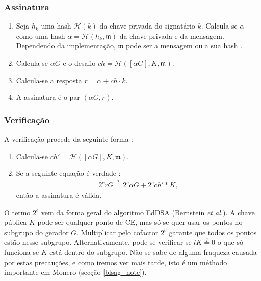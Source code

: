 \begin{enumerate}
\subsubsection*{Assinatura}

\begin{enumerate}
	\item Seja \(h_k\) uma hash \(\mathcal{H}(k)\) da chave privada do signatário \(k\). Calcula-se \(\alpha\) como uma hash \(\alpha = \mathcal{H}(h_k, \mathfrak{m})\) da chave privada e da mensagem. Dependendo da implementação, $\mathfrak{m}$ pode ser a mensagem ou a sua hash \cite{rfc8032}.  

	
	\item Calcula-se \(\alpha G\) e o desafio $ch = \mathcal{H}([\alpha G], K,  \mathfrak{m})$.

	\item Calcula-se a resposta \(r = \alpha + ch \cdot k \).
	
	\item A assinatura é o par \((\alpha G, r)\).
\end{enumerate}

\subsubsection*{Verificação}
A verificação procede da seguinte forma :

\begin{enumerate}
	\item Calcula-se \(ch' = \mathcal{H}([\alpha G], K,  \mathfrak{m})\).
	
	\item Se a seguinte equação é verdade :
\begin{align*}
2^c r G \stackrel{?}{=} 2^c \alpha G + 2^c ch'*K ,
\end{align*}
então a assinatura é válida.
\end{enumerate}

O termo $2^c$ vem da forma geral do algoritmo EdDSA (Bernstein {\em et al.}\cite{Bernstein2012}).  
A chave pública $K$ pode ser qualquer ponto de CE, mas só se quer usar os pontos no subgrupo do gerador $G$. Multiplicar pelo cofactor $2^c$ garante que todos os pontos estão nesse subgrupo. Alternativamente, pode-se verificar se $l K \stackrel{?}{=} 0$ o que só funciona se $K$ está dentro do subgrupo. Não se sabe de alguma fraqueza causada por estas precauções, e como iremos ver mais tarde, isto é um méthodo importante em Monero (secção \ref{blsag_note}).       


\end{enumerate}
